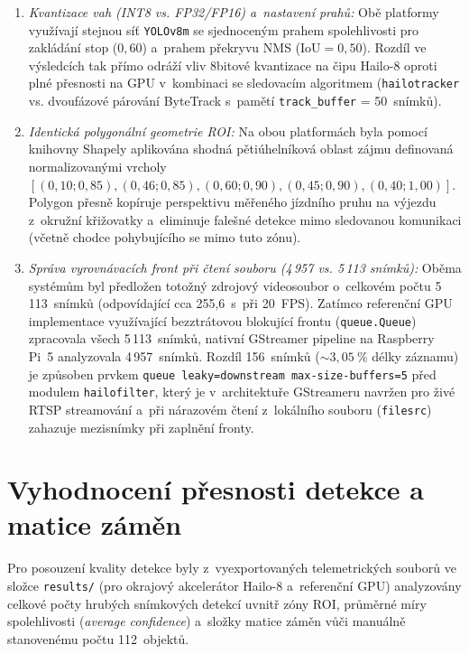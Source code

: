 \begin{enumerate}
    \item \textit{Kvantizace vah (INT8 vs. FP32/FP16) a~nastavení prahů:} Obě platformy využívají stejnou síť \texttt{YOLOv8m} se sjednoceným prahem spolehlivosti pro zakládání stop ($0{,}60$) a~prahem překryvu \acs{NMS} ($\text{IoU} = 0{,}50$). Rozdíl ve výsledcích tak přímo odráží vliv 8bitové kvantizace na čipu Hailo-8 oproti plné přesnosti na GPU v~kombinaci se sledovacím algoritmem (\texttt{hailotracker} vs. dvoufázové párování ByteTrack s~pamětí \texttt{track\_buffer} = 50~snímků).
    \item \textit{Identická polygonální geometrie ROI:} Na obou platformách byla pomocí knihovny Shapely aplikována shodná pětiúhelníková oblast zájmu definovaná normalizovanými vrcholy $[(0{,}10; 0{,}85), (0{,}46; 0{,}85), (0{,}60; 0{,}90), (0{,}45; 0{,}90), (0{,}40; 1{,}00)]$. Polygon přesně kopíruje perspektivu měřeného jízdního pruhu na výjezdu z~okružní křižovatky a~eliminuje falešné detekce mimo sledovanou komunikaci (včetně chodce pohybujícího se mimo tuto zónu).
    \item \textit{Správa vyrovnávacích front při čtení souboru (4\,957 vs. 5\,113 snímků):} Oběma systémům byl předložen totožný zdrojový videosoubor o~celkovém počtu 5\,113~snímků (odpovídající cca 255,6~s~při 20~FPS). Zatímco referenční GPU implementace využívající bezztrátovou blokující frontu (\texttt{queue.Queue}) zpracovala všech 5\,113~snímků, nativní GStreamer pipeline na Raspberry Pi~5 analyzovala 4\,957~snímků. Rozdíl 156~snímků ($\sim 3{,}05~\%$ délky záznamu) je způsoben prvkem \texttt{queue leaky=downstream max-size-buffers=5} před modulem \texttt{hailofilter}, který je v~architektuře GStreameru navržen pro živé \acs{RTSP} streamování a~při nárazovém čtení z~lokálního souboru (\texttt{filesrc}) zahazuje mezisnímky při zaplnění fronty.
\end{enumerate}

\section{Vyhodnocení přesnosti detekce a matice záměn}
Pro posouzení kvality detekce byly z~vyexportovaných telemetrických souborů ve složce \texttt{results/} (pro okrajový akcelerátor Hailo-8 a~referenční GPU) analyzovány celkové počty hrubých snímkových detekcí uvnitř zóny ROI, průměrné míry spolehlivosti (\textit{average confidence}) a~složky matice záměn vůči manuálně stanovenému počtu 112~objektů.


